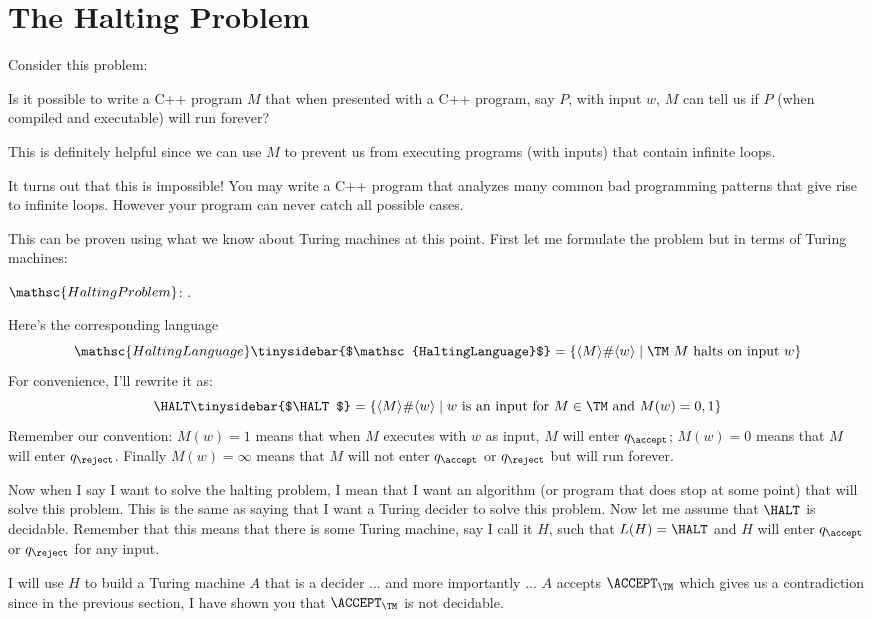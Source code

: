 \section{The Halting Problem}

Consider this problem:

Is it possible to write a C++ program $M$ that when presented with 
a C++ program, say $P$, with input $w$, $M$ can tell us if $P$
(when compiled and executable) will run forever?

This is definitely helpful since we can use $M$ to prevent us from 
executing programs (with inputs) that contain infinite loops.

It turns out that this is impossible!
You may write a C++ program that analyzes many common bad 
programming patterns
that give rise to infinite loops.
However your program can never catch all possible cases.

This can be proven using what we know about Turing machines at this point.
First let me formulate the problem but in terms of Turing machines:

$\mathsc{HaltingProblem}$:
.

Here's the corresponding language 
\[
\mathsc{HaltingLanguage}\tinysidebar{$\mathsc{HaltingLanguage}$}\index{haltinglanguage@$\mathsc{HaltingLanguage}$} = 
\{
\langle M \rangle \# \langle w \rangle \mid \TM \ M \text{ halts on input }
w\}
\]
For convenience, I'll rewrite it as:
\[
\HALT\tinysidebar{$\HALT$}\index{halt@$\HALT$}
= \{\langle M \rangle \# \langle w \rangle 
\mid 
\text{$w$ is an input for $M \in \TM$ and }
M(w) = 0, 1\}
\]
Remember our convention:
$M(w) = 1$ means that when $M$ executes with $w$ as input, $M$
will enter $q_\accept$;
$M(w) = 0$ means that $M$ will enter $q_\reject$.
Finally $M(w) = \infty$ means that $M$ will not enter $q_\accept$
or $q_\reject$ but will run forever.

Now when I say I want to solve the halting problem, I mean that 
I want an algorithm (or program that does stop at some point)
that will solve this problem.
This is the same as saying that I want a Turing decider to solve
this problem.
Now let me assume that $\HALT$ is decidable.
Remember that this means that there is some Turing machine,
say I call it $H$,
such that $L(H) = \HALT$ and $H$ will 
enter $q_\accept$ or $q_\reject$ for any input.

I will use $H$ to build a Turing machine $A$ that is a decider ...
and more importantly ... $A$ accepts $\ACCEPT_\TM$
which gives us a contradiction since in the previous section,
I have shown you that $\ACCEPT_\TM$ is not decidable.

